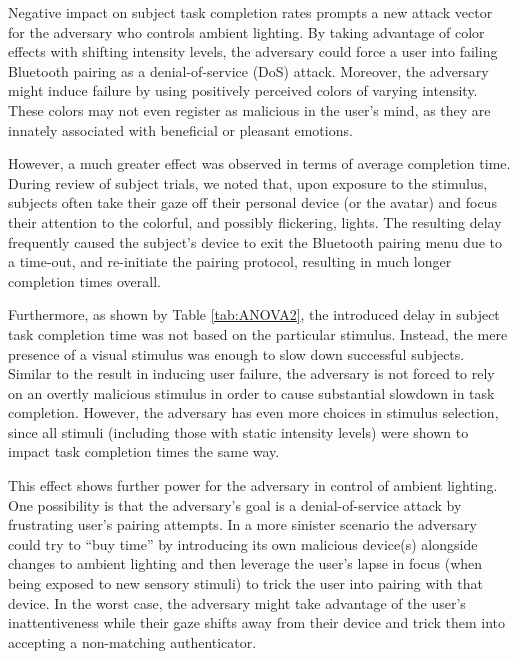 \documentclass{llncs}
\begin{document}
Negative impact on subject task completion rates prompts a new attack vector for the 
adversary who controls ambient lighting. By taking advantage of color effects 
with shifting intensity levels, the adversary could force a user into failing  
Bluetooth pairing as a denial-of-service (DoS) attack. Moreover, 
the adversary might induce failure by using positively perceived colors of varying intensity. 
These colors may not even register as malicious in the user's mind, 
as they are innately associated with beneficial or pleasant emotions.

However, a much greater effect was observed in terms of average completion time. During 
review of subject trials, we noted that, upon exposure to the stimulus, subjects often 
take their gaze off their personal device (or the avatar) and focus their 
attention to the colorful, and possibly flickering, lights. The resulting delay frequently caused the 
subject's device to exit the Bluetooth pairing menu due to a time-out, and re-initiate the 
pairing protocol, resulting in much longer completion times overall. 

Furthermore, as shown by Table \ref{tab:ANOVA2}, the introduced delay in subject task completion time was 
not based on the particular stimulus. Instead, the mere presence of a visual stimulus 
was enough to slow down successful subjects. Similar to the result in inducing user failure, 
the adversary is not forced to rely on an overtly malicious stimulus in order to cause 
substantial slowdown in task completion.  However, the adversary has even more choices
in stimulus selection, since all stimuli (including those with static intensity levels) 
were shown to impact task completion times the same way.

This effect shows further power for the adversary in control of ambient lighting. 
One possibility is that the adversary's goal is a denial-of-service attack by frustrating user's 
pairing attempts. In a more sinister scenario
the adversary could try to ``buy time'' by introducing its own malicious device(s)
alongside changes to ambient lighting and then leverage the user's lapse in focus 
(when being exposed to new sensory stimuli) to trick the user into pairing with that device. 
In the worst case, the adversary might take advantage of the user's inattentiveness while their 
gaze shifts away from their device and trick them into accepting a non-matching 
authenticator. 
\end{document}

